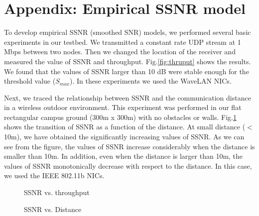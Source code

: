 \section*{Appendix: Empirical SSNR model}

To develop empirical SSNR (smoothed SNR) models, we performed several
basic experiments in our testbed.  We transmitted a constant rate UDP
stream at 1 Mbps between two nodes. Then we changed the location of
the receiver and measured the value of SSNR and throughput.
Fig.\ref{fig:thruput} shows the results. We found that the values of
SSNR larger than 10 dB were stable enough for the threshold value
($S_{max}$).  In these experiments we used the WaveLAN NICs.

Next, we traced the relationship between SSNR and the communication
distance in a wireless outdoor environment. This experiment was
performed in our flat rectangular campus ground (300m x 300m) with no
obstacles or walls.  Fig.\ref{fig:snr-dis} shows the transition of
SSNR as a function of the distance. At small distance ($<$ 10m), we
have obtained the significantly increasing values of SSNR.  As we can
see from the figure, the values of SSNR increase considerably when the
distance is smaller than 10m. In addition, even when the distance is
larger than 10m, the values of SSNR monotonically decrease with
respect to the distance.  In this case, we used the IEEE 802.11b NICs.

\begin{figure}[htb]%
\begin{center}
\vspace{-6mm}
\caption{SSNR vs. throughput}
\label{fig:thruput}
\end{center}
\vspace{4mm}
\begin{center}
\caption{\label{fig:snr-dis} SSNR vs. Distance}
\end{center}
\end{figure}%

